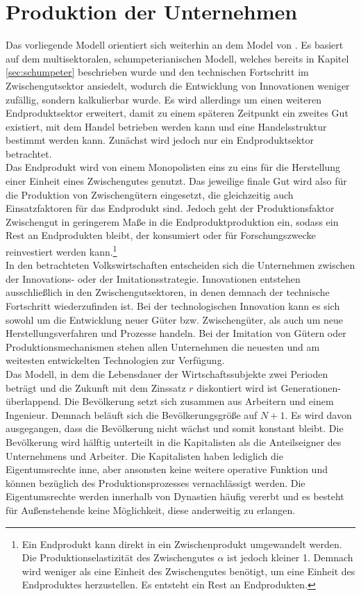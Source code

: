 \section{Produktion der Unternehmen}\label{sec:Produktion}
Das vorliegende Modell orientiert sich weiterhin an dem Model von \citet{Acemoglu.2006}. Es basiert auf dem multisektoralen, schumpeterianischen Modell, welches bereits in Kapitel \ref{sec:schumpeter} beschrieben wurde und den technischen Fortschritt im Zwischengutsektor ansiedelt, wodurch die Entwicklung von Innovationen weniger zufällig, sondern kalkulierbar wurde. Es wird allerdings um einen weiteren Endproduktsektor erweitert, damit zu einem späteren Zeitpunkt ein zweites Gut existiert, mit dem Handel betrieben werden kann und eine Handelsstruktur bestimmt werden kann. Zunächst wird jedoch nur ein Endproduktsektor betrachtet.\\
Das Endprodukt wird von einem Monopolisten eins zu eins für die Herstellung einer Einheit eines Zwischengutes genutzt. Das jeweilige finale Gut wird also für die Produktion von Zwischengütern eingesetzt, die gleichzeitig auch Einsatzfaktoren für das Endprodukt sind. Jedoch geht der Produktionsfaktor Zwischengut in geringerem Ma{\ss}e in die Endproduktproduktion ein, sodass ein Rest an Endprodukten bleibt, der konsumiert oder für Forschungszwecke reinvestiert werden kann.\footnote{Ein Endprodukt kann direkt in ein Zwischenprodukt umgewandelt werden. Die Produktionselastizität des Zwischengutes $\alpha$ ist jedoch kleiner 1. Demnach wird weniger als eine Einheit des Zwischengutes benötigt, um eine Einheit des Endproduktes herzustellen. Es entsteht ein Rest an Endprodukten.}\\


In den betrachteten Volkswirtschaften entscheiden sich die Unternehmen zwischen der Innovations- oder der Imitationsstrategie. Innovationen entstehen ausschlie{\ss}lich in den Zwischengutsektoren, in denen demnach der technische Fortschritt wiederzufinden ist. Bei der technologischen Innovation kann es sich sowohl um die Entwicklung neuer Güter bzw. Zwischengüter, als auch um neue Herstellungsverfahren und Prozesse handeln. Bei der Imitation von Gütern oder Produktionsmechanismen stehen allen Unternehmen die neuesten und am weitesten entwickelten Technologien zur Verfügung.\\


Das Modell, in dem die Lebensdauer der Wirtschaftssubjekte zwei Perioden beträgt und die Zukunft mit dem Zinssatz $r$ diskontiert wird ist Generationen-überlappend. Die Bevölkerung setzt sich zusammen aus Arbeitern und einem Ingenieur. Demnach beläuft sich die Bevölkerungsgrö{\ss}e auf $N+1$. Es wird davon ausgegangen, dass die Bevölkerung  nicht wächst und somit konstant bleibt. Die Bevölkerung wird hälftig unterteilt in die Kapitalisten als die Anteilseigner des Unternehmens und Arbeiter. Die Kapitalisten haben lediglich die Eigentumsrechte inne, aber ansonsten keine weitere operative Funktion und können bezüglich des Produktionsprozesses vernachlässigt werden. Die Eigentumsrechte werden innerhalb von Dynastien häufig vererbt und es besteht für Au{\ss}enstehende keine Möglichkeit, diese anderweitig zu erlangen.\\


